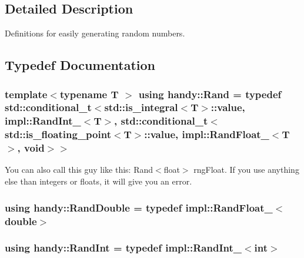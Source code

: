 \subsection{Detailed Description}
Definitions for easily generating random numbers. 



\subsection{Typedef Documentation}
\subsubsection[{\texorpdfstring{Rand}{Rand}}]{\setlength{\rightskip}{0pt plus 5cm}template$<$typename T $>$ using {\bf handy\+::\+Rand} = typedef std\+::conditional\+\_\+t$<${\bf std\+::is\+\_\+integral}$<$T$>$\+::value, impl\+::\+Rand\+Int\+\_\+$<$T$>$, std\+::conditional\+\_\+t$<${\bf std\+::is\+\_\+floating\+\_\+point}$<$T$>$\+::value, impl\+::\+Rand\+Float\+\_\+$<$T$>$, void$>$$>$}\hypertarget{group__RandomGroup_gaa56330e62ab8c2abe507a74d49b70969}{}\label{group__RandomGroup_gaa56330e62ab8c2abe507a74d49b70969}
You can also call this guy like this\+: \textquotesingle{}Rand$<$float$>$ rng\+Float\textquotesingle{}. If you use anything else than integers or floats, it will give you an error. 
\subsubsection[{\texorpdfstring{Rand\+Double}{RandDouble}}]{\setlength{\rightskip}{0pt plus 5cm}using {\bf handy\+::\+Rand\+Double} = typedef impl\+::\+Rand\+Float\+\_\+$<$double$>$}\hypertarget{group__RandomGroup_gace607d3788e863aab630c29521cdcf3d}{}\label{group__RandomGroup_gace607d3788e863aab630c29521cdcf3d}
\subsubsection[{\texorpdfstring{Rand\+Int}{RandInt}}]{\setlength{\rightskip}{0pt plus 5cm}using {\bf handy\+::\+Rand\+Int} = typedef impl\+::\+Rand\+Int\+\_\+$<$int$>$}\hypertarget{group__RandomGroup_gafccf8f163a45086036ca7b3bec3413f5}{}\label{group__RandomGroup_gafccf8f163a45086036ca7b3bec3413f5}


